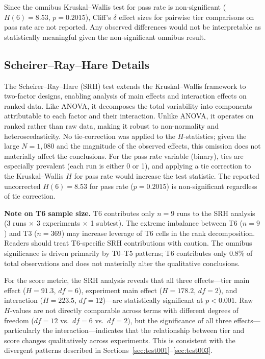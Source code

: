 \documentclass[11pt]{article}
\begin{document}
Since the omnibus Kruskal--Wallis test for pass rate is non-significant
($H(6)=8.53$, $p=0.2015$), Cliff's $\delta$ effect sizes for pairwise tier
comparisons on pass rate are not reported. Any observed differences would not
be interpretable as statistically meaningful given the non-significant omnibus
result.

\subsection{Scheirer--Ray--Hare Details}

The Scheirer--Ray--Hare (SRH) test extends the Kruskal--Wallis framework to
two-factor designs, enabling analysis of main effects and interaction effects
on ranked data. Like ANOVA, it decomposes the total variability into
components attributable to each factor and their interaction. Unlike ANOVA,
it operates on ranked rather than raw data, making it robust to non-normality
and heteroscedasticity. No tie-correction was applied to the $H$-statistics;
given the large $N=1{,}080$ and the magnitude of the observed effects, this
omission does not materially affect the conclusions. For the pass rate
variable (binary), ties are especially prevalent (each run is either 0 or 1),
and applying a tie correction to the Kruskal--Wallis $H$ for pass rate would
increase the test statistic. The reported uncorrected $H(6)=8.53$ for pass
rate ($p=0.2015$) is non-significant regardless of tie correction.

\textbf{Note on T6 sample size.} T6 contributes only $n=9$ runs to the SRH
analysis (3 runs $\times$ 3 experiments $\times$ 1 subtest). The extreme
imbalance between T6 ($n=9$) and T3 ($n=369$) may increase leverage of T6
cells in the rank decomposition. Readers should treat T6-specific SRH
contributions with caution. The omnibus significance is driven primarily by
T0--T5 patterns; T6 contributes only 0.8\% of total observations and does
not materially alter the qualitative conclusions.

For the score metric, the SRH analysis reveals that all three effects---tier
main effect ($H = 91.3$, $df = 6$), experiment main effect ($H = 178.2$,
$df = 2$), and interaction ($H = 223.5$, $df = 12$)---are statistically
significant at $p < 0.001$. Raw $H$-values are not directly comparable across
terms with different degrees of freedom ($df = 12$ vs.\ $df = 6$ vs.\
$df = 2$), but the significance of all three effects---particularly the
interaction---indicates that the relationship between
tier and score changes qualitatively across experiments. This is consistent with the divergent patterns described in
Sections~\ref{sec:test001}--\ref{sec:test003}.
\end{document}
